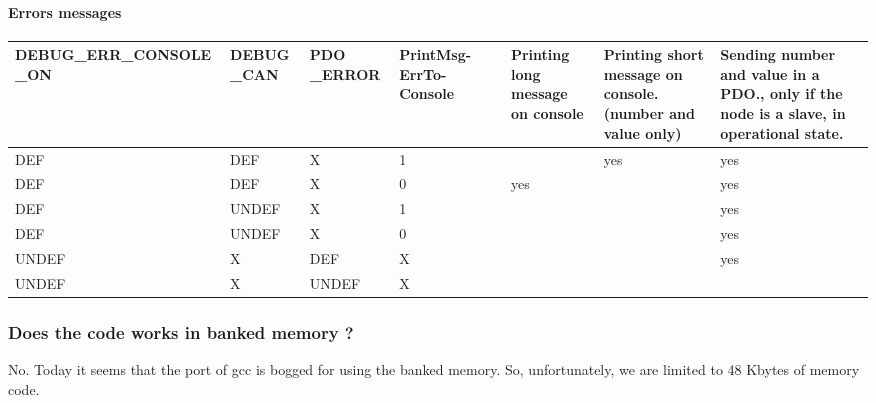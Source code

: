 \documentclass[12pt,twoside]{article}
\begin{document}
\paragraph{Errors messages}
\begin{longtable}[c]{|p{0.8476598in}|p{0.7351598in}|p{0.6511598in}|p{0.7865598in}|p{-0.026640158in}|p{0.8087598in}|p{0.9955599in}|p{1.1858599in}|}
\hline
{\bfseries
DEBUG\_ERR\_CONSOLE \_ON}
&
{\bfseries
DEBUG \_CAN}
&
{\bfseries
PDO \_ERROR }
&
{\bfseries
PrintMsg{}-ErrTo{}-Console}
&

\bigskip
&
{\bfseries
Printing long message on console}
&
\textbf{Printing short message on console.} (number and value only) 
&
\textbf{Sending number and value in a PDO}., only if the node is a
slave, in operational state. 
\\\hline
\endhead
DEF
&
DEF
&
X
&
1
&

\bigskip
&

\bigskip
&
yes
&
yes
\\\hline
DEF
&
DEF
&
X
&
0
&

\bigskip
&
yes
&

\bigskip
&
yes
\\\hline
DEF
&
UNDEF
&
X
&
1
&

\bigskip
&

\bigskip
&

\bigskip
&
yes
\\\hline
DEF
&
UNDEF
&
X
&
0
&

\bigskip
&

\bigskip
&

\bigskip
&
yes
\\\hline
UNDEF
&
X
&
DEF
&
X
&

\bigskip
&

\bigskip
&

\bigskip
&
yes
\\\hline
UNDEF
&
X
&
UNDEF
&
X
&

\bigskip
&

\bigskip
&

\bigskip
&

\bigskip
\\\hline
\end{longtable}

\bigskip

\subsubsection{Does the code works in banked memory ?}
No. Today it seems that the port of gcc is bogged for using the banked
memory. So, unfortunately, we are limited to 48 Kbytes of memory code.
\end{document}
